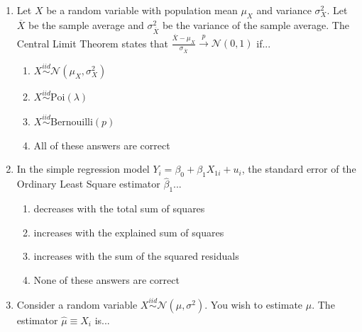 \documentclass{article}
\begin{document}
\begin{enumerate}
\begin{enumerate}[label=\alph*)]
\item The Central Limit Theorem
\item The Weak Law of Large Numbers
\item The Gauss-Markov Theorem 
\item None of these answers are correct
\end{enumerate}\vspace{.25cm}



\item Let $X$ be a random variable with population mean $\mu_X$ and variance $\sigma^2_{X}$. Let $\overline{X}$ be the sample average and $\sigma^2_{\overline{X}}$ be the variance of the sample average. The Central Limit Theorem states that $\frac{\overline{X}-\mu_X}{\sigma_{\overline{X}}}\overset{p}{\to}\mathcal{N}(0,1)$ if...

\begin{enumerate}[label=\alph*)]
\item $X\stackrel{iid}{\sim}\mathcal{N}(\mu_X, \sigma_X^2)$
\item $X\stackrel{iid}{\sim}\text{Poi}(\lambda)$
\item $X\stackrel{iid}{\sim}\text{Bernouilli}(p)$
\item All of these answers are correct
\end{enumerate}\vspace{.25cm}


\item In the simple regression model $Y_i = \beta_0 + \beta_1 X_{1i} + u_i$, the standard error of the Ordinary Least Square estimator $\hat{\beta}_1$...

\begin{enumerate}[label=\alph*)]
\item decreases with the total sum of squares
\item increases with the explained sum of squares
\item increases with the sum of the squared residuals
\item None of these answers are correct
\end{enumerate}\vspace{.25cm}


\item Consider a random variable $X\stackrel{iid}{\sim}\mathcal{N}(\mu, \sigma^2)$. You wish to estimate $\mu$. The estimator $\hat{\mu}\equiv X_i$ is...


\end{enumerate}
\end{document}
